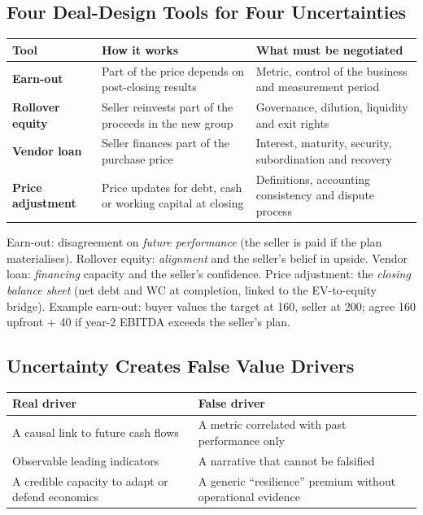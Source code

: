 \subsection{Four Deal-Design Tools for Four Uncertainties}
\begin{center}
\small
\begin{tabular}{@{}>{\bfseries}l p{5.2cm}p{6cm}@{}}
\toprule
\textnormal{\textbf{Tool}} & \textbf{How it works} & \textbf{What must be negotiated}\\
\midrule
Earn-out & Part of the price depends on post-closing results & Metric, control of the business and measurement period\\
Rollover equity & Seller reinvests part of the proceeds in the new group & Governance, dilution, liquidity and exit rights\\
Vendor loan & Seller finances part of the purchase price & Interest, maturity, security, subordination and recovery\\
Price adjustment & Price updates for debt, cash or working capital at closing & Definitions, accounting consistency and dispute process\\
\bottomrule
\end{tabular}
\end{center}
\begin{addbox}
Earn-out: disagreement on \emph{future performance} (the seller is paid if the plan materialises). Rollover equity: \emph{alignment} and the seller's belief in upside. Vendor loan: \emph{financing} capacity and the seller's confidence. Price adjustment: the \emph{closing balance sheet} (net debt and WC at completion, linked to the EV-to-equity bridge). Example earn-out: buyer values the target at 160, seller at 200; agree 160 upfront $+$ 40 if year-2 EBITDA exceeds the seller's plan.
\end{addbox}

\subsection{Uncertainty Creates False Value Drivers}
\begin{center}
\small
\begin{tabular}{@{}p{7cm}p{7cm}@{}}
\toprule
\textbf{Real driver} & \textbf{False driver}\\
\midrule
A causal link to future cash flows & A metric correlated with past performance only\\
Observable leading indicators & A narrative that cannot be falsified\\
A credible capacity to adapt or defend economics & A generic ``resilience'' premium without operational evidence\\
\bottomrule
\end{tabular}
\end{center}

